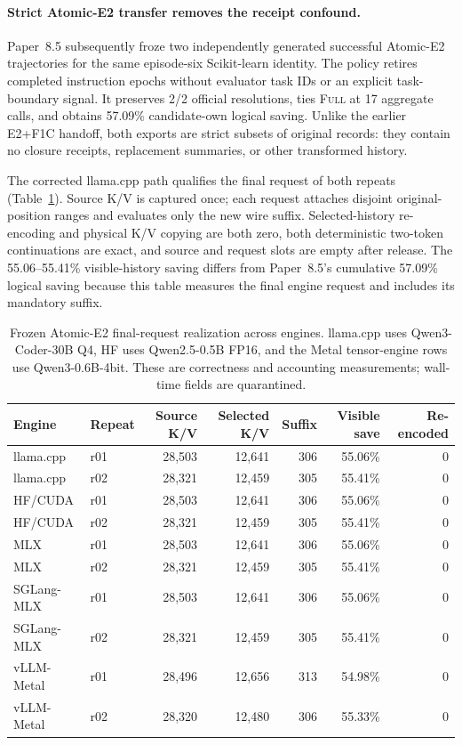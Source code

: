 \documentclass[11pt]{article}
\begin{document}
\paragraph{Strict Atomic-E2 transfer removes the receipt confound.}
Paper~8.5 subsequently froze two independently generated successful
Atomic-E2 trajectories for the same episode-six Scikit-learn identity.  The
policy retires completed instruction epochs without evaluator task IDs or an
explicit task-boundary signal.  It preserves 2/2 official resolutions, ties
\textsc{Full} at 17 aggregate calls, and obtains 57.09\% candidate-own logical
saving.  Unlike the earlier E2+F1C handoff, both exports are strict subsets of
original records: they contain no closure receipts, replacement summaries, or
other transformed history.

The corrected llama.cpp path qualifies the final request of both repeats
(Table~\ref{tab:agent-atomic-e2-engines}).  Source K/V is captured once; each
request attaches disjoint original-position ranges and evaluates only the new
wire suffix.  Selected-history re-encoding and physical K/V copying are both
zero, both deterministic two-token continuations are exact, and source and
request slots are empty after release.  The 55.06--55.41\% visible-history
saving differs from Paper~8.5's cumulative 57.09\% logical saving because this
table measures the final engine request and includes its mandatory suffix.

\begin{table}[H]
\centering
\small
\caption{Frozen Atomic-E2 final-request realization across engines.  llama.cpp
uses Qwen3-Coder-30B Q4, HF uses Qwen2.5-0.5B FP16, and the Metal tensor-engine
rows use Qwen3-0.6B-4bit.  These are correctness and accounting measurements;
wall-time fields are quarantined.}
\begin{tabular}{llrrrrr}
\toprule
Engine & Repeat & Source K/V & Selected K/V & Suffix & Visible save & Re-encoded \\
\midrule
llama.cpp & r01 & 28,503 & 12,641 & 306 & 55.06\% & 0 \\
llama.cpp & r02 & 28,321 & 12,459 & 305 & 55.41\% & 0 \\
HF/CUDA & r01 & 28,503 & 12,641 & 306 & 55.06\% & 0 \\
HF/CUDA & r02 & 28,321 & 12,459 & 305 & 55.41\% & 0 \\
MLX & r01 & 28,503 & 12,641 & 306 & 55.06\% & 0 \\
MLX & r02 & 28,321 & 12,459 & 305 & 55.41\% & 0 \\
SGLang-MLX & r01 & 28,503 & 12,641 & 306 & 55.06\% & 0 \\
SGLang-MLX & r02 & 28,321 & 12,459 & 305 & 55.41\% & 0 \\
vLLM-Metal & r01 & 28,496 & 12,656 & 313 & 54.98\% & 0 \\
vLLM-Metal & r02 & 28,320 & 12,480 & 306 & 55.33\% & 0 \\
\bottomrule
\end{tabular}
\label{tab:agent-atomic-e2-engines}
\end{table}
\end{document}
